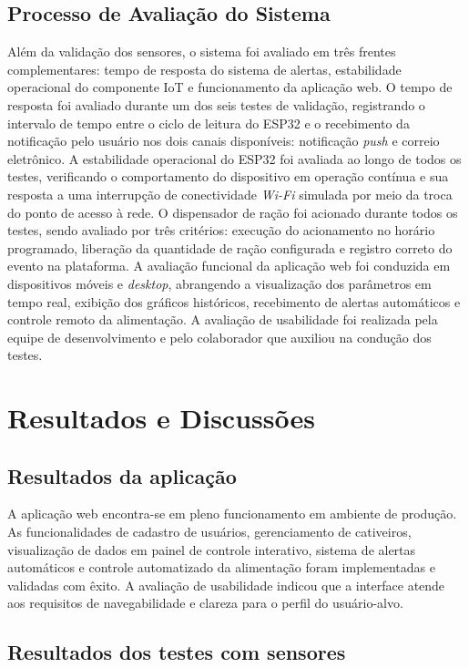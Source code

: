 \documentclass[11pt,a4paper]{article}
\begin{document}
\subsection{Processo de Avaliação do Sistema}
Além da validação dos sensores, o sistema foi avaliado em três frentes complementares: tempo de resposta do sistema de alertas, estabilidade operacional do componente IoT e funcionamento da aplicação web.
O tempo de resposta foi avaliado durante um dos seis testes de validação, registrando o intervalo de tempo entre o ciclo de leitura do ESP32 e o recebimento da notificação pelo usuário nos dois canais disponíveis: notificação \textit{push} e correio eletrônico.
A estabilidade operacional do ESP32 foi avaliada ao longo de todos os testes, verificando o comportamento do dispositivo em operação contínua e sua resposta a uma interrupção de conectividade \textit{Wi-Fi} simulada por meio da troca do ponto de acesso à rede.
O dispensador de ração foi acionado durante todos os testes, sendo avaliado por três critérios: execução do acionamento no horário programado, liberação da quantidade de ração configurada e registro correto do evento na plataforma.
A avaliação funcional da aplicação web foi conduzida em dispositivos móveis e \textit{desktop}, abrangendo a visualização dos parâmetros em tempo real, exibição dos gráficos históricos, recebimento de alertas automáticos e controle remoto da alimentação. A avaliação de usabilidade foi realizada pela equipe de desenvolvimento e pelo colaborador que auxiliou na condução dos testes.

\section{Resultados e Discussões}

\subsection{Resultados da aplicação}

A aplicação web encontra-se em pleno funcionamento em ambiente de produção. As funcionalidades de cadastro de usuários, gerenciamento de cativeiros, visualização de dados em painel de controle interativo, sistema de alertas automáticos e controle automatizado da alimentação foram implementadas e validadas com êxito. A avaliação de usabilidade indicou que a interface atende aos requisitos de navegabilidade e clareza para o perfil do usuário-alvo.

\subsection{Resultados dos testes com sensores}
\end{document}
